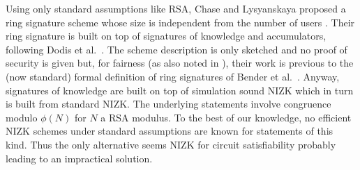 Using only standard assumptions like RSA, Chase and Lysyanskaya proposed a ring signature scheme whose size is independent from the number of users \cite{C:ChaLys06}. %
Their ring signature is built on top of
signatures of knowledge and accumulators, following Dodis et al.~\cite{EC:DKNS04}. The scheme description is only sketched and no proof of security is given but, for fairness (as also noted in \cite{AC:MalSch17}), their work is previous to the (now standard) formal definition of ring signatures of Bender et al.~\cite{TCC:BenKatMor06}.
Anyway, signatures of knowledge are built on top of simulation sound NIZK which in turn is built from standard NIZK. The underlying statements involve congruence modulo $\phi(N)$ for $N$ a RSA modulus. To the best of our knowledge, no efficient NIZK schemes under standard assumptions are known for statements of this kind. Thus the only alternative seems NIZK for circuit satisfiability probably leading to an impractical solution.

